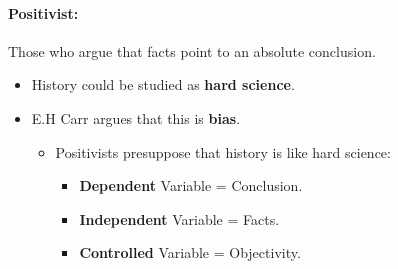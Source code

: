 \documentclass[11pt]{book}
\begin{document}
						\paragraph{Positivist:}
					Those who argue that facts point to an absolute conclusion.
							\begin{itemize}
								\item History could be studied as \textbf{hard science}.
								\item E.H Carr argues that this is \textbf{bias}.
										\begin{itemize}
											\item Positivists presuppose that history is like hard science:
												\begin{itemize}
													\item \textbf{Dependent} Variable = Conclusion.
													\item \textbf{Independent} Variable = Facts.
													\item \textbf{Controlled} Variable = Objectivity.
												\end{itemize}
										\end{itemize}
							\end{itemize}

					
\end{document}
